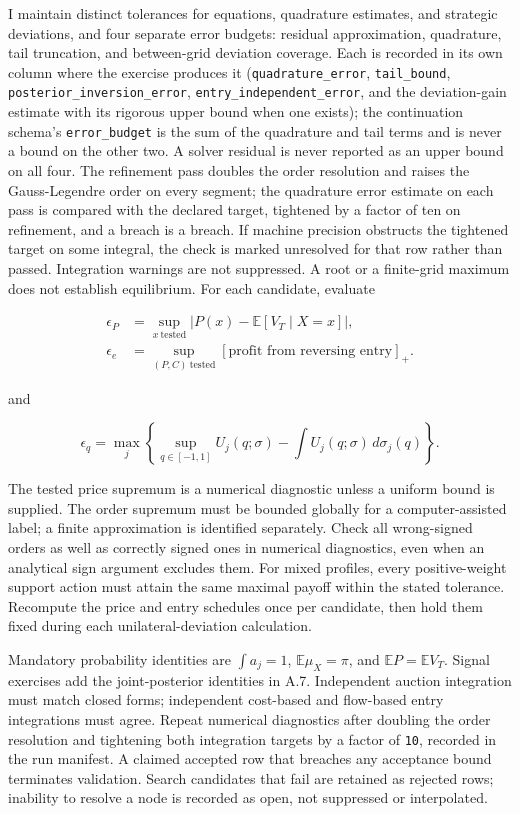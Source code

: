 \documentclass[
  11pt,
]{article}
\begin{document}
I maintain distinct tolerances for equations, quadrature estimates, and
strategic deviations, and four separate error budgets: residual
approximation, quadrature, tail truncation, and between-grid deviation
coverage. Each is recorded in its own column where the exercise produces
it (\texttt{quadrature\_error}, \texttt{tail\_bound},
\texttt{posterior\_inversion\_error},
\texttt{entry\_independent\_error}, and the deviation-gain estimate with
its rigorous upper bound when one exists); the continuation schema's
\texttt{error\_budget} is the sum of the quadrature and tail terms and
is never a bound on the other two. A solver residual is never reported
as an upper bound on all four. The refinement pass doubles the order
resolution and raises the Gauss-Legendre order on every segment; the
quadrature error estimate on each pass is compared with the declared
target, tightened by a factor of ten on refinement, and a breach is a
breach. If machine precision obstructs the tightened target on some
integral, the check is marked unresolved for that row rather than
passed. Integration warnings are not suppressed. A root or a finite-grid
maximum does not establish equilibrium. For each candidate, evaluate

\[
\begin{aligned}
\epsilon_P&=\sup_{x\ \mathrm{tested}}|P(x)-\mathbb E[V_T\mid X=x]|,\\
\epsilon_e&=\sup_{(P,C)\ \mathrm{tested}}[\text{profit from reversing entry}]_+.
\end{aligned}
\tag{OA.75}\label{eq:oa-oa-75}
\]

and

\[
\epsilon_q=\max_j\left\{\sup_{q\in[-1,1]}U_j(q;\sigma)-\int U_j(q;\sigma)\,d\sigma_j(q)\right\}.
\tag{OA.76}\label{eq:oa-oa-76}
\]

The tested price supremum is a numerical diagnostic unless a uniform
bound is supplied. The order supremum must be bounded globally for a
computer-assisted label; a finite approximation is identified
separately. Check all wrong-signed orders as well as correctly signed
ones in numerical diagnostics, even when an analytical sign argument
excludes them. For mixed profiles, every positive-weight support action
must attain the same maximal payoff within the stated tolerance.
Recompute the price and entry schedules once per candidate, then hold
them fixed during each unilateral-deviation calculation.

Mandatory probability identities are \(\int a_j=1\),
\(\mathbb E\mu_X=\pi\), and \(\mathbb E P=\mathbb E V_T\). Signal
exercises add the joint-posterior identities in A.7. Independent auction
integration must match closed forms; independent cost-based and
flow-based entry integrations must agree. Repeat numerical diagnostics
after doubling the order resolution and tightening both integration
targets by a factor of \texttt{10}, recorded in the run manifest. A
claimed accepted row that breaches any acceptance bound terminates
validation. Search candidates that fail are retained as rejected rows;
inability to resolve a node is recorded as open, not suppressed or
interpolated.
\end{document}
